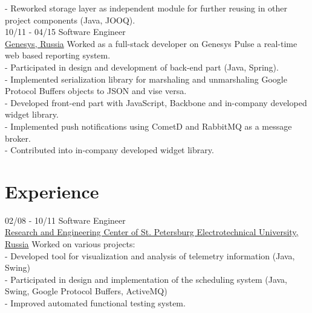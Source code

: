 \documentclass[]{friggeri-cv}
\begin{document}
\begin{entrylist}
{    - Reworked storage layer as independent module for further reusing in other project components (Java, JOOQ).\\}
    \entry
    {10/11 - 04/15}
    {Software Engineer\\}
    {\href{http://www.genesys.com/}{Genesys, Russia}}
    {Worked as a full-stack developer on Genesys Pulse a real-time web based reporting system. \\
    - Participated in design and development of back-end part (Java, Spring). \\
    - Implemented serialization library for marshaling and unmarshaling Google Protocol Buffers objects to JSON and vise versa. \\
    - Developed front-end part with JavaScript, Backbone and in-company developed widget library. \\
    - Implemented push notifications using CometD and RabbitMQ as a message broker.\\
    - Contributed into in-company developed widget library.\\}
    
\end{entrylist}

\newpage
\section{Experience}
\begin{entrylist}
\entry
    {02/08 - 10/11}
    {Software Engineer\\}
    {\href{http://nicetu.spb.ru/index.php/en}{Research and Engineering Center of St. Petersburg Electrotechnical University, Russia}}
    {Worked on various projects: \\
    - Developed tool for visualization and analysis of telemetry information (Java, Swing) \\
    - Participated in design and implementation of the scheduling system (Java, Swing, Google Protocol Buffers, ActiveMQ) \\
    - Improved automated functional testing system.}
\end{entrylist}
\end{document}
